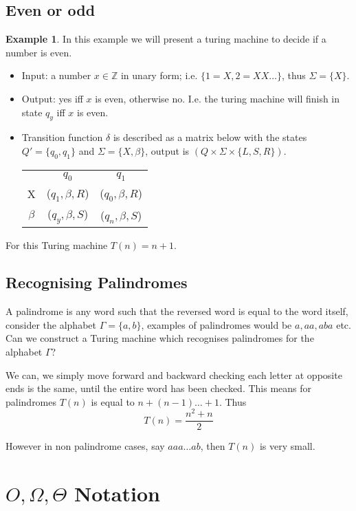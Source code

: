 \documentclass{article}
\theoremstyle{definition}
\newtheorem{example}{Example}[section]
\begin{document}
\subsection{Even or odd}
\begin{example}
	In this example we will present a turing machine to decide if a number is even.
	\begin{itemize}
		\item Input: a number $x \in \mathbb{Z}$ in unary form; i.e. $\{1 = X, 2 = XX\dots\}$,
			thus $\Sigma = \{X\}$.
		\item Output: yes iff $x$ is even, otherwise no. I.e. the turing machine will finish
			in state $q_y$ iff $x$ is even.
		\item Transition function $\delta$ is described as a matrix below with the states
			$Q\prime = \{q_0,q_1\}$ and $\Sigma = \{X,\beta\}$,
			output is $(Q \times \Sigma \times \{L,S,R\})$.
		\begin{center}
			\begin{tabular}{ c c c }
					 & $q_0$           & $q_1$           \\
				X    & ($q_1,\beta,R$) & ($q_0,\beta,R$) \\
			 $\beta$ & ($q_y,\beta,S$) & ($q_n,\beta,S$) \\
			\end{tabular}
		\end{center}
	\end{itemize}
	For this Turing machine $T(n) = n + 1$.
\end{example}

\subsection{Recognising Palindromes}

A palindrome is any word such that the reversed word is equal to the word itself,
consider the alphabet $\Gamma = \{a,b\}$, examples of palindromes would be $a, aa, aba$ etc.
Can we construct a Turing machine which recognises palindromes for the alphabet $\Gamma$?

We can, we simply move forward and backward checking each letter at opposite ends is the same,
until the entire word has been checked.
This means for palindromes $T(n)$ is equal to $n + (n - 1) \dots + 1$. Thus
$$T(n) = \frac{n^2 + n}{2}$$

However in non palindrome cases, say $aaa \dots ab$, then $T(n)$ is very small.

\section{$O, \Omega, \Theta$ Notation}
\end{document}
